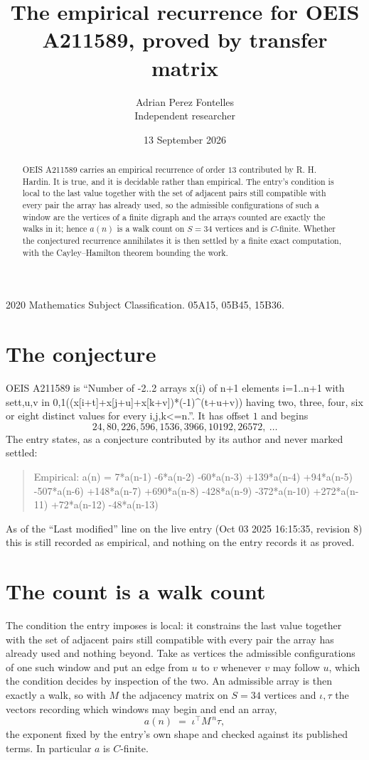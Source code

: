 \documentclass[11pt,a4paper]{article}
\title{The empirical recurrence for OEIS A211589, proved by transfer matrix}
\author{Adrian Perez Fontelles\\ \small Independent researcher}
\date{13 September 2026}
\theoremstyle{plain}
\theoremstyle{definition}
\begin{document}
\maketitle

\begin{abstract}
OEIS A211589 carries an empirical recurrence of order $13$ contributed by R. H. Hardin. It is
true, and it is decidable rather than empirical. The entry's condition is local to the last value together with the set of adjacent pairs still compatible with every pair the array has already used, so
the admissible configurations of such a window are the vertices of a finite digraph and the
arrays counted are exactly the walks in it; hence $a(n)$ is a walk count on $S=34$ vertices
and is $C$-finite. Whether the conjectured recurrence annihilates it is then settled by a
finite exact computation, with the Cayley--Hamilton theorem bounding the work.
\end{abstract}

\noindent\small 2020 Mathematics Subject Classification. 05A15, 05B45, 15B36.\normalsize

\section{The conjecture}

OEIS A211589 is ``Number of -2..2 arrays x(i) of n+1 elements i=1..n+1 with set{t,u,v in 0,1}((x[i+t]+x[j+u]+x[k+v])*(-1)\^{}(t+u+v)) having two, three, four, six or eight distinct values for every i,j,k<=n.''. It has offset $1$ and begins
\[
24, 80, 226, 596, 1536, 3966, 10192, 26572,\ \dots
\]
The entry states, as a conjecture contributed by its author and never marked settled:
\begin{quote}
Empirical: a(n) = 7*a(n-1) -6*a(n-2) -60*a(n-3) +139*a(n-4) +94*a(n-5) -507*a(n-6) +148*a(n-7) +690*a(n-8) -428*a(n-9) -372*a(n-10) +272*a(n-11) +72*a(n-12) -48*a(n-13)
\end{quote}
As of the ``Last modified'' line on the live entry (Oct 03 2025 16:15:35, revision 8) this is still
recorded as empirical, and nothing on the entry records it as proved.

\section{The count is a walk count}

The condition the entry imposes is local: it constrains the last value together with the set of adjacent pairs still compatible with every pair the array has already used and nothing beyond. Take as
vertices the admissible configurations of one such window and put an edge from $u$ to $v$
whenever $v$ may follow $u$, which the condition decides by inspection of the two. An
admissible array is then exactly a walk, so with $M$ the adjacency matrix on $S=34$ vertices
and $\iota,\tau$ the vectors recording which windows may begin and end an array,
\[
a(n)\;=\;\iota^{\!\top}M^{\,n}\tau ,
\]
the exponent fixed by the entry's own shape and checked against its published terms. In
particular $a$ is $C$-finite.
\end{document}
